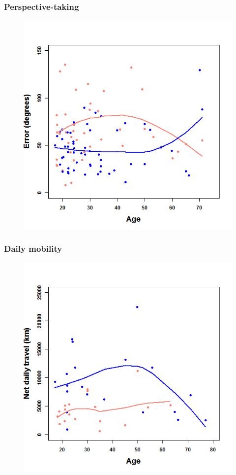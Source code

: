 \documentclass{beamer}
\begin{document}

\begin{frame}
\frametitle{Perspective-taking}
\begin{figure}
\includegraphics[width=0.75\linewidth]{prspage}
\end{figure}
\end{frame}


\begin{frame}
\frametitle{Daily mobility}
\begin{figure}
\includegraphics[width=0.75\linewidth]{tracking}
\end{figure}
\end{frame}
\end{document}

